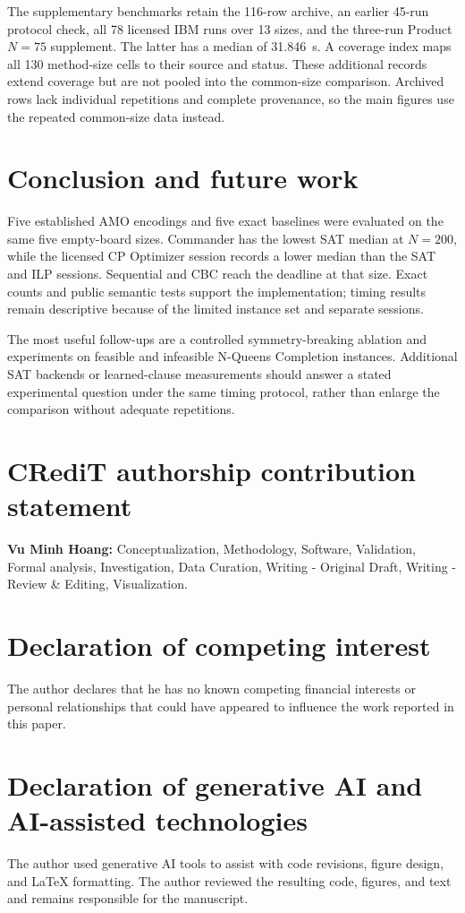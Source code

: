 \documentclass[a4paper,fleqn]{cas-sc}
\begin{document}
The supplementary benchmarks retain the 116-row archive, an earlier 45-run protocol check, all 78 licensed IBM runs over 13 sizes, and the three-run Product $N=75$ supplement. The latter has a median of 31.846~s. A coverage index maps all 130 method-size cells to their source and status. These additional records extend coverage but are not pooled into the common-size comparison. Archived rows lack individual repetitions and complete provenance, so the main figures use the repeated common-size data instead.

\FloatBarrier
\section{Conclusion and future work}
Five established AMO encodings and five exact baselines were evaluated on the same five empty-board sizes. Commander has the lowest SAT median at $N=200$, while the licensed CP Optimizer session records a lower median than the SAT and ILP sessions. Sequential and CBC reach the deadline at that size. Exact counts and public semantic tests support the implementation; timing results remain descriptive because of the limited instance set and separate sessions.

The most useful follow-ups are a controlled symmetry-breaking ablation and experiments on feasible and infeasible N-Queens Completion instances. Additional SAT backends or learned-clause measurements should answer a stated experimental question under the same timing protocol, rather than enlarge the comparison without adequate repetitions.

\section*{CRediT authorship contribution statement}
\textbf{Vu Minh Hoang:} Conceptualization, Methodology, Software, Validation, Formal analysis, Investigation, Data Curation, Writing - Original Draft, Writing - Review \& Editing, Visualization.

\section*{Declaration of competing interest}
The author declares that he has no known competing financial interests or personal relationships that could have appeared to influence the work reported in this paper.

\section*{Declaration of generative AI and AI-assisted technologies}
The author used generative AI tools to assist with code revisions, figure design, and LaTeX formatting. The author reviewed the resulting code, figures, and text and remains responsible for the manuscript.
\end{document}
